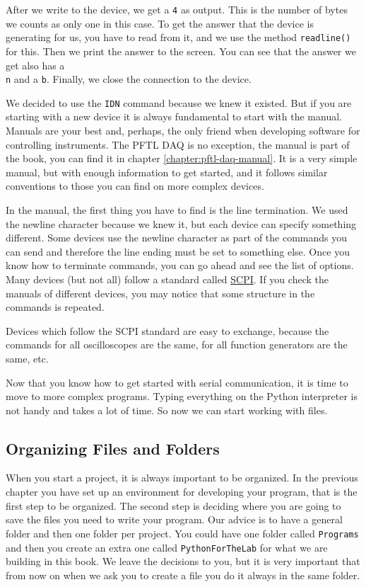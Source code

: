 After we write to the device, we get a \texttt{4} as output. This is the number of bytes we \texttt{\n} counts as only one in this case. To get the answer that the device is generating for us, you have to read from it, and we use the method \texttt{readline()} for this. Then we print the answer to the screen. You can see that the answer we get also has a \texttt{\\n} and a \texttt{b}. Finally, we close the connection to the device.

We decided to use the \texttt{IDN} command because we knew it existed. But if you are starting with a new device it is always fundamental to start with the manual. Manuals are your best and, perhaps, the only friend when developing software for controlling instruments. The {PFTL DAQ} is no exception, the manual is part of the book, you can find it in chapter \ref{chapter:pftl-daq-manual}. It is a very simple manual, but with enough information to get started, and it follows similar conventions to those you can find on more complex devices.

In the manual, the first thing you have to find is the line termination. We used the newline character because we knew it, but each device can specify something different. Some devices use the newline character as part of the commands you can send and therefore the line ending must be set to something else. Once you know how to terminate commands, you can go ahead and see the list of options. Many devices (but not all) follow a standard called \href{https://en.wikipedia.org/wiki/Standard_Commands_for_Programmable_Instruments}{SCPI}. If you check the manuals of different devices, you may notice that some structure in the commands is repeated.

Devices which follow the SCPI standard are easy to exchange, because the commands for all oscilloscopes are the same, for all function generators are the same, etc.

Now that you know how to get started with serial communication, it is time to move to more complex programs. Typing everything on the Python interpreter is not handy and takes a lot of time. So now we can start working with files.

\subsection{Organizing Files and Folders}
When you start a project, it is always important to be organized. In the previous chapter you have set up an environment for developing your program, that is the first step to be organized. The second step is deciding where you are going to save the files you need to write your program. Our advice is to have a general folder and then one folder per project. You could have one folder called \texttt{Programs} and then you create an extra one called \texttt{PythonForTheLab} for what we are building in this book. We leave the decisions to you, but it is very important that from now on when we ask you to create a file you do it always in the same folder.

